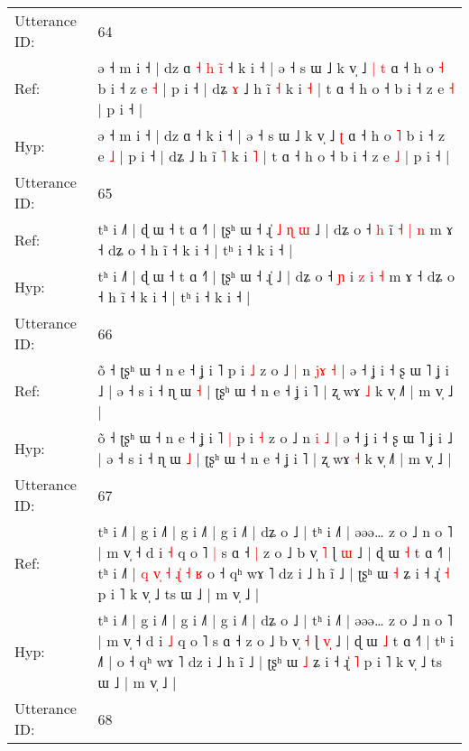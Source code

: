 \documentclass[10pt]{article}
\DeclareRobustCommand{\hl}[1]{{\textcolor{red}{#1}}}
\begin{document}
\begin{longtable}{ll}
 \\
\midrule
Utterance ID: & 64 \\
Ref: & ə ˧ m i ˧ | dz ɑ\hl{ }\hl{˧}\hl{ }\hl{h}\hl{ }\hl{i}\hl{̃} ˧ k i ˧ | ə ˧ s ɯ ˩ k v̩ ˩\hl{ }\hl{|} \hl{t} ɑ ˧ h o \hl{˧} b i ˧ z e \hl{˧} | p i ˧ | dʑ\hl{ }\hl{ɤ} ˩ h ĩ \hl{˧} k i \hl{˧} | t ɑ ˧ h o ˧ b i ˧ z e \hl{˧} | p i ˧ |
 \\
Hyp: & ə ˧ m i ˧ | dz ɑ\hl{}\hl{}\hl{}\hl{}\hl{}\hl{}\hl{} ˧ k i ˧ | ə ˧ s ɯ ˩ k v̩ ˩\hl{}\hl{} \hl{ʈ} ɑ ˧ h o \hl{˥} b i ˧ z e \hl{˩} | p i ˧ | dʑ\hl{}\hl{} ˩ h ĩ \hl{˥} k i \hl{˥} | t ɑ ˧ h o ˧ b i ˧ z e \hl{˩} | p i ˧ |
 \\
\midrule
Utterance ID: & 65 \\
Ref: & tʰ i ˩˥ | ɖ ɯ ˧ t ɑ ˧˥ | ʈʂʰ ɯ ˧ ɻ̍\hl{ }\hl{˩}\hl{ }\hl{ɳ}\hl{ }\hl{ɯ} ˩ | dʑ o ˧ \hl{h} i\hl{̃} \hl{˧} \hl{|} \hl{n} m ɤ ˧ dʑ o ˧ h ĩ ˧ k i ˧ | tʰ i ˧ k i ˧ |
 \\
Hyp: & tʰ i ˩˥ | ɖ ɯ ˧ t ɑ ˧˥ | ʈʂʰ ɯ ˧ ɻ̍\hl{}\hl{}\hl{}\hl{}\hl{}\hl{} ˩ | dʑ o ˧ \hl{ɲ} i\hl{} \hl{z} \hl{i} \hl{˧} m ɤ ˧ dʑ o ˧ h ĩ ˧ k i ˧ | tʰ i ˧ k i ˧ |
 \\
\midrule
Utterance ID: & 66 \\
Ref: & õ ˧ ʈʂʰ ɯ ˧ n e ˧ ʝ i ˥\hl{}\hl{} p i \hl{˩} z o ˩\hl{ }\hl{|} n \hl{j}\hl{ɤ} \hl{˧} | ə ˧ ʝ i ˧ ʂ ɯ ˥ ʝ i ˩ | ə ˧ s i ˧ ɳ ɯ \hl{˧} | ʈʂʰ ɯ ˧ n e ˧ ʝ i ˥ | ʐ wɤ \hl{˩} k v̩ ˩˥ | m v̩ ˩ |
 \\
Hyp: & õ ˧ ʈʂʰ ɯ ˧ n e ˧ ʝ i ˥\hl{ }\hl{|} p i \hl{˧} z o ˩\hl{}\hl{} n \hl{}\hl{i} \hl{˩} | ə ˧ ʝ i ˧ ʂ ɯ ˥ ʝ i ˩ | ə ˧ s i ˧ ɳ ɯ \hl{˩} | ʈʂʰ ɯ ˧ n e ˧ ʝ i ˥ | ʐ wɤ \hl{˧} k v̩ ˩˥ | m v̩ ˩ |
 \\
\midrule
Utterance ID: & 67 \\
Ref: & tʰ i ˩˥ | g i ˩˥ | g i ˩˥ | g i ˩˥ | dʑ o ˩ | tʰ i ˩˥ | əəə… z o ˩ n o ˥ | m v̩ ˧ d i \hl{˧} q o ˥\hl{ }\hl{|} s ɑ ˧\hl{ }\hl{|} z o ˩ b v̩ \hl{˥} ɭ \hl{}\hl{ɯ} ˩ | ɖ ɯ \hl{˧} t ɑ ˧˥ | tʰ i ˩˥ |\hl{ }\hl{q}\hl{ }\hl{v}\hl{̩}\hl{ }\hl{˧}\hl{ }\hl{ɻ}\hl{̍}\hl{ }\hl{˧}\hl{ }\hl{ʁ} o ˧ qʰ wɤ ˥ dz i ˩ h ĩ ˩ | ʈʂʰ ɯ \hl{˧} ʑ i ˧ ɻ̍ \hl{˧} p i ˥ k v̩ ˩ ts ɯ ˩ | m v̩ ˩ |
 \\
Hyp: & tʰ i ˩˥ | g i ˩˥ | g i ˩˥ | g i ˩˥ | dʑ o ˩ | tʰ i ˩˥ | əəə… z o ˩ n o ˥ | m v̩ ˧ d i \hl{˩} q o ˥\hl{}\hl{} s ɑ ˧\hl{}\hl{} z o ˩ b v̩ \hl{˧} ɭ \hl{v}\hl{̩} ˩ | ɖ ɯ \hl{˩} t ɑ ˧˥ | tʰ i ˩˥ |\hl{}\hl{}\hl{}\hl{}\hl{}\hl{}\hl{}\hl{}\hl{}\hl{}\hl{}\hl{}\hl{}\hl{} o ˧ qʰ wɤ ˥ dz i ˩ h ĩ ˩ | ʈʂʰ ɯ \hl{˩} ʑ i ˧ ɻ̍ \hl{˥} p i ˥ k v̩ ˩ ts ɯ ˩ | m v̩ ˩ |
 \\
\midrule
Utterance ID: & 68 \\

\end{longtable}
\end{document}
